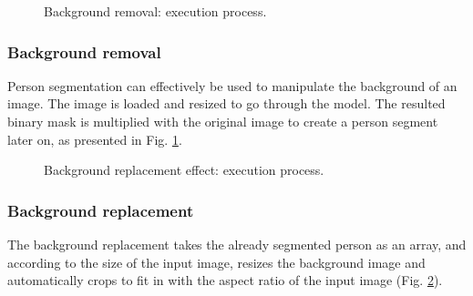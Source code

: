\documentclass[english]{sbrt}
\begin{document}
\begin{figure}[H]
\centering 
{}
\caption{\label{fig:graph1} Background removal: execution process.}
\end{figure}

\subsubsection{Background removal}
Person segmentation can effectively be used to manipulate the background of an image.
The image is loaded and resized to go through the model. The resulted binary mask is multiplied with the original image to create a person segment later on, as presented in Fig. \ref{fig:graph1}.

\begin{figure}[H]
\centering 
{}
\caption{\label{fig:graph2} Background replacement effect: execution process.}
\end{figure}

\subsubsection{Background replacement}
The background replacement takes the already segmented person as an array, and according to the size of the input image, resizes the background image and automatically crops to fit in with the aspect ratio of the input image (Fig. \ref{fig:graph2}).
\end{document}
